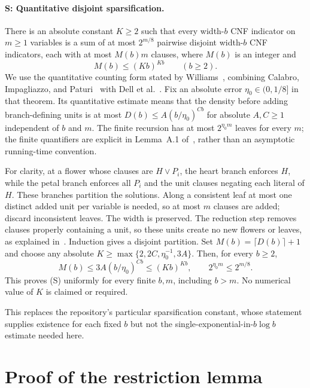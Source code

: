 \documentclass[11pt]{article}
\begin{document}
\paragraph{S: Quantitative disjoint sparsification.}
There is an absolute constant
$K\ge2$ such that every width-$b$ CNF indicator on $m\ge1$ variables is
a sum of at most $2^{m/8}$ pairwise disjoint width-$b$ CNF indicators,
each with at most $M(b)m$ clauses, where $M(b)$ is an integer and
\begin{equation}\label{eq:sparse}
 M(b)\le(Kb)^{Kb}\qquad(b\ge2).
\end{equation}
We use the quantitative counting form stated by
Williams~\cite[Section~4, p.~6:9]{Williams}, combining
Calabro, Impagliazzo, and Paturi~\cite[Section~6]{CIP} with
Dell et al.~\cite[Appendix~A, Lemma~A.1 and its following proof]{DHMTW}.
Fix an absolute error $\eta_0\in(0,1/8]$ in that theorem. Its quantitative
estimate means that the density before adding branch-defining units is
at most $D(b)\le A(b/\eta_0)^{Cb}$ for absolute $A,C\ge1$ independent
of $b$ and $m$. The finite recursion has at most $2^{\eta_0m}$ leaves
for every $m$; the finite quantifiers are explicit in Lemma~A.1
of~\cite{DHMTW}, rather than an asymptotic running-time convention.

For clarity, at a flower whose clauses are $H\vee P_i$, the heart branch
enforces $H$, while the petal branch enforces all $P_i$ and the unit clauses
negating each literal of $H$. These branches partition the solutions.
Along a consistent leaf at most one distinct added unit per variable is
needed, so at most $m$ clauses are added; discard inconsistent leaves.
The width is preserved. The reduction step removes clauses properly
containing a unit, so these units create no new flowers or leaves, as
explained in~\cite[Appendix~A]{DHMTW}. Induction gives a disjoint partition.
Set $M(b)=\lceil D(b)\rceil+1$ and choose any absolute
$K\ge\max\{2,2C,\eta_0^{-1},3A\}$. Then, for every $b\ge2$,
\[
 M(b)\le3A(b/\eta_0)^{Cb}\le(Kb)^{Kb},\qquad
 2^{\eta_0m}\le2^{m/8}.
\]
This proves (S) uniformly for every finite $b,m$, including $b>m$.
No numerical value of $K$ is claimed or required.

This replaces the repository's particular sparsification constant,
whose statement supplies existence for each fixed $b$ but not the
single-exponential-in-$b\log b$ estimate needed here.

\section{Proof of the restriction lemma}
\end{document}
